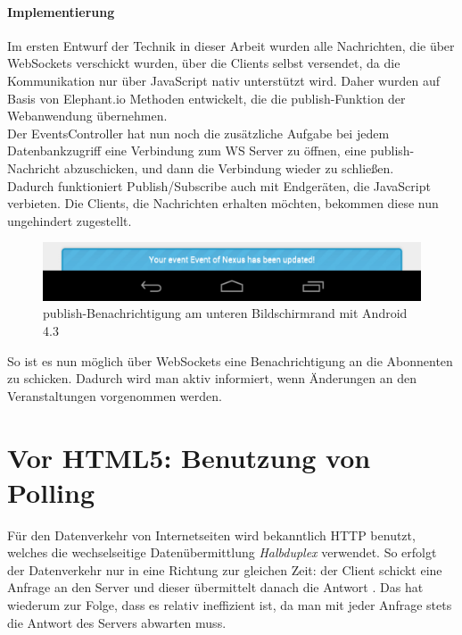 \paragraph{Implementierung}
Im ersten Entwurf der Technik in dieser Arbeit wurden alle Nachrichten, die über WebSockets verschickt wurden, über die Clients selbst versendet, da die Kommunikation nur über JavaScript nativ unterstützt wird. Daher wurden auf Basis von Elephant.io Methoden entwickelt, die die publish-Funktion der Webanwendung übernehmen.\\
Der EventsController hat nun noch die zusätzliche Aufgabe bei jedem Datenbankzugriff eine Verbindung zum WS Server zu öffnen, eine publish-Nachricht abzuschicken, und dann die Verbindung wieder zu schließen.\\
Dadurch funktioniert Publish/Subscribe auch mit Endgeräten, die JavaScript verbieten. Die Clients, die Nachrichten erhalten möchten, bekommen diese nun ungehindert zugestellt.\par

\begin{figure}[!ht]
	\centering
	\includegraphics[width=15cm]{fig/noty_android}
	\caption{publish-Benachrichtigung am unteren Bildschirmrand mit Android 4.3}
\end{figure}

So ist es nun möglich über WebSockets eine Benachrichtigung an die Abonnenten zu schicken. Dadurch wird man aktiv informiert, wenn Änderungen an den Veranstaltungen vorgenommen werden. 


\section{Vor HTML5: Benutzung von Polling}
Für den Datenverkehr von Internetseiten wird bekanntlich HTTP benutzt, welches die wechselseitige Datenübermittlung \emph{Halbduplex} verwendet. So erfolgt der Datenverkehr nur in eine Richtung zur gleichen Zeit: der Client schickt eine Anfrage an den Server und dieser übermittelt danach die Antwort \cite[S. 5]{ws}. Das hat wiederum zur Folge, dass es relativ ineffizient ist, da man mit jeder Anfrage stets die Antwort des Servers abwarten muss.\par

